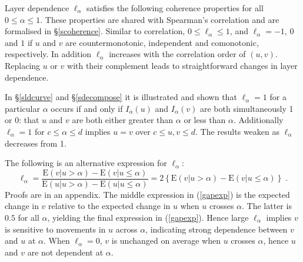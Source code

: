 \documentclass[authoryear]{elsarticle}
\newcommand{\cov}{{\rm cov}}
\newcommand{\E}{{\mathrm E}}
\newcommand{\cor}{\mathrm{cor}}
\newcommand{\cq}{\ ,\quad }
\newcommand{\eref}[1]{(\ref{#1})}
\newcommand{\sref}[1]{\S\ref{#1}}
\begin{document}
Layer dependence $\ell_\alpha$ satisfies the following coherence properties for all $0\le\alpha\le 1$. These properties are shared with Spearman's correlation and are formalised in \sref{scoherence}. Similar to correlation, $0\le\ell_\alpha\le 1$, and $\ell_\alpha=-1$, $0$ and $1$ if $u$ and $v$ are countermonotonic, independent and comonotonic, respectively. In addition $\ell_\alpha$ increases with the correlation order of $(u,v)$. Replacing $u$ or $v$ with their complement leads to straightforward changes in layer dependence.

In \sref{sldcurve} and \sref{sdecompose} it is illustrated and shown  that  $\ell_\alpha=1$ for a particular $\alpha$ occurs if and only if $I_\alpha(u)$ and $I_\alpha(v)$ are both simultaneously 1 or 0: that $u$ and $v$ are both  either greater than $\alpha$ or less than $\alpha$.  Additionally $\ell_\alpha=1$ for $c\le\alpha\le d$ implies $u=v$ over $c\le u,v\le d$. The results weaken as $\ell_\alpha$ decreases from 1.


The following is an alternative expression for $\ell_\alpha$:
\begin{equation}\label{gapexp}
\ell_\alpha = \frac{\E(v|u>\alpha)-\E(v|u\leq \alpha)}{\E(u|u>\alpha)-\E(u|u\leq \alpha)}
=2 \left\{\E(v|u>\alpha)-\E(v|u\leq \alpha)\right\}\;.
\end{equation}
Proofs are in an appendix. The middle expression in \eref{gapexp} is the expected change in $v$ relative to the expected change in $u$ when $u$ crosses $\alpha$. The latter is $0.5$ for all $\alpha$, yielding the final expression in \eref{gapexp}. Hence large $\ell_\alpha$ implies $v$ is sensitive to movements in $u$ across $\alpha$, indicating strong dependence between $v$ and $u$ at $\alpha$. When $\ell_\alpha=0$, $v$ is unchanged on average when $u$ crosses $\alpha$, hence $u$ and $v$ are not dependent at $\alpha$.

\end{document}
